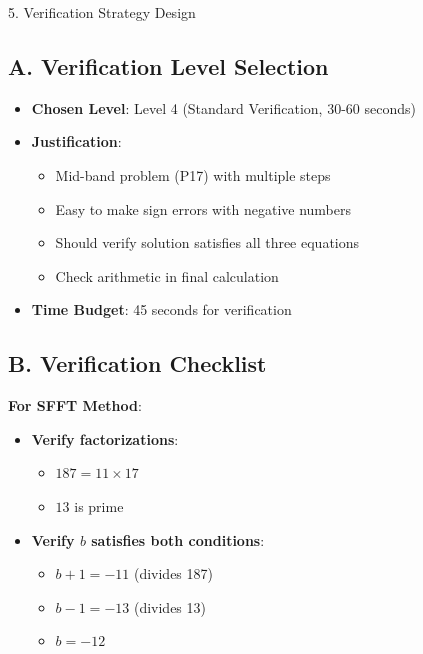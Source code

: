 \documentclass[12pt]{article}
\begin{document}
\begin{verificationbox}{5. Verification Strategy Design}

\subsection*{A. Verification Level Selection}
\begin{itemize}[leftmargin=*]
    \item \textbf{Chosen Level}: Level 4 (Standard Verification, 30-60 seconds)
    
    \item \textbf{Justification}: 
    \begin{itemize}
        \item Mid-band problem (P17) with multiple steps
        \item Easy to make sign errors with negative numbers
        \item Should verify solution satisfies all three equations
        \item Check arithmetic in final calculation
    \end{itemize}
    
    \item \textbf{Time Budget}: 45 seconds for verification
\end{itemize}

\subsection*{B. Verification Checklist}

\textbf{For SFFT Method}:
\begin{itemize}
    \item \textbf{Verify factorizations}:
    \begin{itemize}
        \item $187 = 11 \times 17$ \checkmark
        \item $13$ is prime \checkmark
    \end{itemize}
    
    \item \textbf{Verify $b$ satisfies both conditions}:
    \begin{itemize}
        \item $b+1 = -11$ (divides 187) \checkmark
        \item $b-1 = -13$ (divides 13) \checkmark
        \item $b = -12$ \checkmark
    \end{itemize}
    

\end{itemize}
\end{verificationbox}
\end{document}
